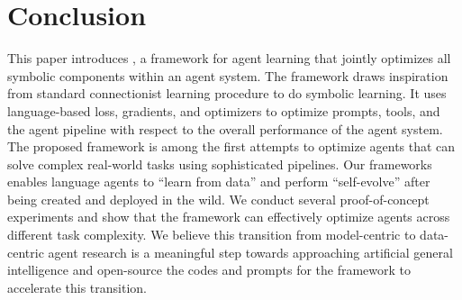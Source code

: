 \section{Conclusion}
This paper introduces \baby, a framework for agent learning that jointly optimizes all symbolic components within an agent system. The \baby framework draws inspiration from standard connectionist learning procedure to do symbolic learning. It uses language-based loss, gradients, and optimizers to optimize prompts, tools, and the agent pipeline with respect to the overall performance of the agent system. The proposed framework is among the first attempts to optimize agents that can solve complex real-world tasks using sophisticated pipelines. Our frameworks enables language agents to ``learn from data'' and perform ``self-evolve'' after being created and deployed in the wild. We conduct several proof-of-concept experiments and show that the \baby framework can effectively optimize agents across different task complexity. We believe this transition from model-centric to data-centric agent research is a meaningful step towards approaching artificial general intelligence and open-source the codes and prompts for the \baby framework to accelerate this transition.


